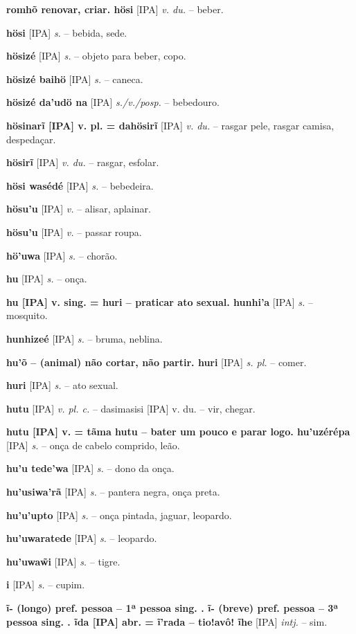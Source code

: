 \textbf{romhõ renovar, criar. hösi} [IPA] \textit{v. du.} -- beber.

\textbf{hösi} [IPA] \textit{s.} -- bebida, sede.

\textbf{hösizé} [IPA] \textit{s.} -- objeto para beber, copo.

\textbf{hösizé baihö} [IPA] \textit{s.} -- caneca.

\textbf{hösizé da'udö na} [IPA] \textit{s./v./posp.} -- bebedouro.

\textbf{hösinarĩ [IPA] v. pl. = dahösirĩ} [IPA] \textit{v. du.} -- rasgar pele, rasgar camisa, despedaçar.

\textbf{hösirĩ} [IPA] \textit{v. du.} -- rasgar, esfolar.

\textbf{hösi wasédé} [IPA] \textit{s.} -- bebedeira.

\textbf{hösu'u} [IPA] \textit{v.} -- alisar, aplainar.

\textbf{hösu'u} [IPA] \textit{v.} -- passar roupa.

\textbf{hö'uwa} [IPA] \textit{s.} -- chorão.

\textbf{hu} [IPA] \textit{s.} -- onça.

\textbf{hu [IPA] v. sing. = huri -- praticar ato sexual. hunhi'a} [IPA] \textit{s.} -- mosquito.

\textbf{hunhizeé} [IPA] \textit{s.} -- bruma, neblina.

\textbf{hu'õ -- (animal) não cortar, não partir. huri} [IPA] \textit{s. pl.} -- comer.

\textbf{huri} [IPA] \textit{s.} -- ato sexual.

\textbf{hutu} [IPA] \textit{v. pl. c.} -- dasimasisi [IPA] v. du. -- vir, chegar.

\textbf{hutu [IPA] v. = tãma hutu -- bater um pouco e parar logo. hu'uzérépa} [IPA] \textit{s.} -- onça de cabelo comprido, leão.

\textbf{hu'u tede'wa} [IPA] \textit{s.} -- dono da onça.

\textbf{hu'usiwa'rã} [IPA] \textit{s.} -- pantera negra, onça preta.

\textbf{hu'u'upto} [IPA] \textit{s.} -- onça pintada, jaguar, leopardo.

\textbf{hu'uwaratede} [IPA] \textit{s.} -- leopardo.

\textbf{hu'uwaw̃i} [IPA] \textit{s.} -- tigre.

\textbf{i} [IPA] \textit{s.} -- cupim.

\textbf{ĩ- (longo) pref. pessoa -- 1ª pessoa sing. . ĩ- (breve) pref. pessoa -- 3ª pessoa sing. . ĩda [IPA] abr. = ĩ'rada -- tio!avô! ĩhe} [IPA] \textit{intj.} -- sim.

